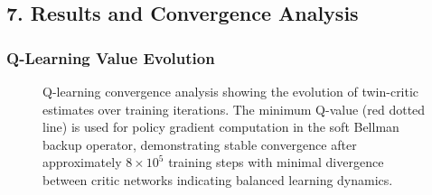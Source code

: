 \documentclass[10pt,a4paper,twocolumn]{article}
\begin{document}
\vfill

\subsection*{7. Results and Convergence Analysis}

\subsubsection*{Q-Learning Value Evolution}

\begin{figure}[h]
    \centering
    \caption{Q-learning convergence analysis showing the evolution of twin-critic estimates over training iterations. The minimum Q-value (red dotted line) is used for policy gradient computation in the soft Bellman backup operator, demonstrating stable convergence after approximately $8 \times 10^5$ training steps with minimal divergence between critic networks indicating balanced learning dynamics.}
    \label{fig:q_convergence}
\end{figure}
\end{document}
